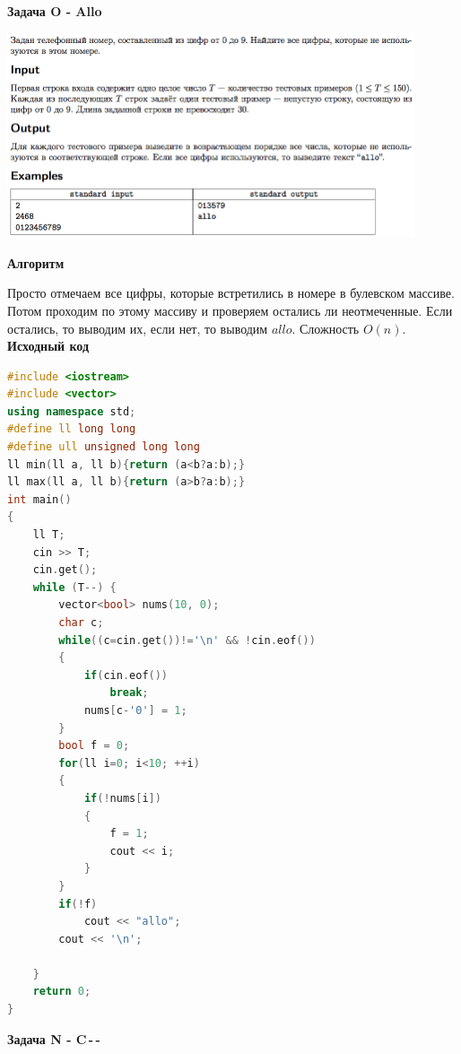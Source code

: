 \documentclass[a4paper,12pt]{article}
\begin{document}
\newpage
\textbf{{\large Задача O - Allo}}

\begin{center}
\includegraphics[width=0.9\textwidth]{OC_Europe/OC_Europe_O.png}\\ [1cm]
\end{center}

\newpage
\textbf{{\large Алгоритм}}

Просто отмечаем все цифры, которые встретились в номере в булевском массиве. Потом проходим по этому массиву и проверяем остались ли неотмеченные. Если остались, то выводим их, если нет, то выводим $allo$. Сложность $O(n)$. \\

\textbf{{\large Исходный код}} \\
\begin{lstlisting}[language=C++]
#include <iostream>
#include <vector>
using namespace std;
#define ll long long
#define ull unsigned long long
ll min(ll a, ll b){return (a<b?a:b);}
ll max(ll a, ll b){return (a>b?a:b);}
int main()
{
    ll T;
    cin >> T;
    cin.get();
    while (T--) {
        vector<bool> nums(10, 0);
        char c;
        while((c=cin.get())!='\n' && !cin.eof())
        {
            if(cin.eof())
                break;
            nums[c-'0'] = 1;
        }
        bool f = 0;
        for(ll i=0; i<10; ++i)
        {
            if(!nums[i])
            {
                f = 1;
                cout << i;
            }
        }
        if(!f)
            cout << "allo";
        cout << '\n';

    }
    return 0;
}
\end{lstlisting}

\newpage
\textbf{{\large Задача N - C\,-\,-}}
\end{document}
